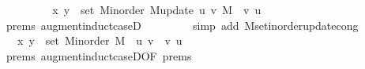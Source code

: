 \begin{isabellebody}
\ \ \ \ \isamarkupfalse%
\ \isamarkupfalse%
\ {\isachardoublequoteopen}{\isachardot}{\kern0pt}{\isachardot}{\kern0pt}{\isachardot}{\kern0pt}\ {\isasymlongleftrightarrow}\ {\isacharparenleft}{\kern0pt}x{\isacharcomma}{\kern0pt}\ y{\isacharparenright}{\kern0pt}\ {\isasymin}\ set\ {\isacharparenleft}{\kern0pt}M{\isacharunderscore}{\kern0pt}inorder\ {\isacharparenleft}{\kern0pt}M{\isacharunderscore}{\kern0pt}update\ u\ v\ M{\isacharparenright}{\kern0pt}{\isacharparenright}{\kern0pt}\ {\isasymunion}\ {\isacharbraceleft}{\kern0pt}{\isacharparenleft}{\kern0pt}v{\isacharcomma}{\kern0pt}\ u{\isacharparenright}{\kern0pt}{\isacharbraceright}{\kern0pt}{\isachardoublequoteclose}\isanewline
\ \ \ \ \ \ \isamarkupfalse%
\ {\isachardoublequoteopen}{}{\isachardot}{\kern0pt}prems{\isachardoublequoteclose}\ augment{\isacharunderscore}{\kern0pt}induct{\isacharunderscore}{\kern0pt}case{\isacharunderscore}{\kern0pt}{}D{\isacharparenleft}{\kern0pt}{}{\isacharcomma}{\kern0pt}\ {}{\isacharparenright}{\kern0pt}\isanewline
\ \ \ \ \ \ \isamarkupfalse%
\ {\isacharparenleft}{\kern0pt}simp\ add{\isacharcolon}{\kern0pt}\ M{\isachardot}{\kern0pt}set{\isacharunderscore}{\kern0pt}inorder{\isacharunderscore}{\kern0pt}update{\isacharunderscore}{\kern0pt}cong{\isacharparenright}{\kern0pt}\isanewline
\ \ \ \ \isamarkupfalse%
\ \isamarkupfalse%
\ {\isachardoublequoteopen}{\isachardot}{\kern0pt}{\isachardot}{\kern0pt}{\isachardot}{\kern0pt}\ {\isasymlongleftrightarrow}\ {\isacharparenleft}{\kern0pt}x{\isacharcomma}{\kern0pt}\ y{\isacharparenright}{\kern0pt}\ {\isasymin}\ set\ {\isacharparenleft}{\kern0pt}M{\isacharunderscore}{\kern0pt}inorder\ M{\isacharparenright}{\kern0pt}\ {\isasymunion}\ {\isacharbraceleft}{\kern0pt}{\isacharparenleft}{\kern0pt}u{\isacharcomma}{\kern0pt}\ v{\isacharparenright}{\kern0pt}{\isacharbraceright}{\kern0pt}\ {\isasymunion}\ {\isacharbraceleft}{\kern0pt}{\isacharparenleft}{\kern0pt}v{\isacharcomma}{\kern0pt}\ u{\isacharparenright}{\kern0pt}{\isacharbraceright}{\kern0pt}{\isachardoublequoteclose}\isanewline
\ \ \ \ \ \ \isamarkupfalse%
\ {\isachardoublequoteopen}{}{\isachardot}{\kern0pt}prems{\isachardoublequoteclose}{\isacharparenleft}{\kern0pt}{}{\isacharparenright}{\kern0pt}\ augment{\isacharunderscore}{\kern0pt}induct{\isacharunderscore}{\kern0pt}case{\isacharunderscore}{\kern0pt}{}D{\isacharparenleft}{\kern0pt}{}{\isacharparenright}{\kern0pt}{\isacharbrackleft}{\kern0pt}OF\ {\isachardoublequoteopen}{}{\isachardot}{\kern0pt}prems{\isachardoublequoteclose}{\isacharbrackright}{\kern0pt}\isanewline

\end{isabellebody}
